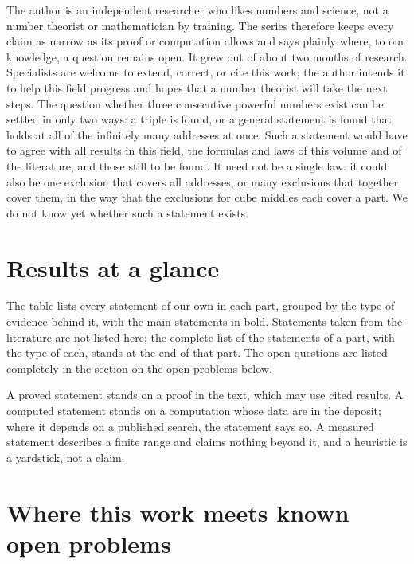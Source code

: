 The author is an independent researcher who likes numbers and science, not a number theorist or mathematician by training. The series
therefore keeps every claim as narrow as its proof or computation allows and says plainly where, to our knowledge, a question remains
open. It grew out of about two months of research. Specialists are welcome to extend, correct, or cite this work; the author intends it to
help this field progress and hopes that a number theorist will take the next steps.
The question whether three consecutive powerful numbers exist can be settled in only two ways: a triple is found, or a general statement is found that holds at all of the infinitely many addresses at once. Such a statement would have to agree with all results in this field, the formulas and laws of this volume and of the literature, and those still to be found. It need not be a single law: it could also be one exclusion that covers all addresses, or many exclusions that together cover them, in the way that the exclusions for cube middles \cite{Chan2025,She2025,Sayim2026EMW} each cover a part. We do not know yet whether such a statement exists.

\section*{Results at a glance}

The table lists every statement of our own in each part, grouped by the type of evidence behind it, with the main statements in bold.
Statements taken from the literature are not listed here; the complete list of the statements of a part, with the type of each, stands at the
end of that part. The open questions are listed completely in the section on the open problems below.



\inwords A proved statement stands on a proof in the text, which may use cited results. A computed statement stands on a computation whose data are in the deposit; where it depends on a published search, the statement says so.
A measured statement describes a finite range and claims nothing beyond it, and a heuristic is a yardstick, not a claim.

\section*{Where this work meets known open problems}

